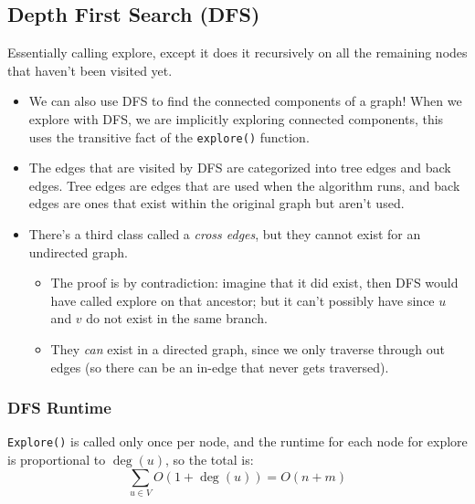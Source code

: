 	\subsection{Depth First Search (DFS)}
	Essentially calling explore, except it does it recursively on all the remaining nodes that haven't 
	been visited yet.
	\begin{itemize}
		\item We can also use DFS to find the connected components of a graph! When we explore with DFS, we are 
			implicitly exploring connected components, this uses the transitive fact of the \texttt{explore()}
			function.
		\item The edges that are visited by DFS are categorized into tree edges and back edges. Tree 
			edges are edges that are used when the algorithm runs, and back edges are ones that exist within 
			the original graph but aren't used. 
		\item There's a third class called a \textit{cross edges}, but they cannot exist for an undirected graph.
			\begin{itemize}
				\item The proof is by contradiction: imagine that it did exist, then DFS would have called
					explore on that ancestor; but it can't possibly have since $u$ and $v$ do not 
					exist in the same branch.
				\item They \textit{can} exist in a directed graph, since we only traverse through out 
					edges (so there can be an in-edge that never gets traversed).
			\end{itemize}
	\end{itemize}	

	\subsubsection{DFS Runtime}
	\texttt{Explore()} is called only once per node, and the runtime for each node for explore is 
	proportional to $\deg(u)$, so the total is:
	\[
		\sum_{u \in V} O(1 + \deg(u)) = O(n + m)
	\] 

